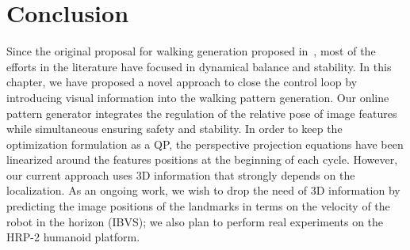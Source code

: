 \section{Conclusion}
\label{sec:conclusions}
Since the original proposal for walking generation proposed in~\citep{Kajita2003}, most of the efforts in the literature have focused in dynamical balance and stability. In this chapter, we have proposed a novel approach to close the control loop by introducing visual information into the walking pattern generation. Our online pattern generator integrates the regulation of the relative pose of image features while simultaneous ensuring safety and stability. In order to keep the optimization formulation as a QP, the perspective projection equations have been linearized around the features positions at the beginning of each cycle. However, our current approach uses 3D information that strongly depends on the localization. As an ongoing work, we wish to drop the need of 3D information by predicting the image positions of the landmarks in terms on the velocity of the robot in the horizon (IBVS); we also plan to perform real experiments on the HRP-2 humanoid platform.
